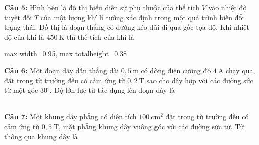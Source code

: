 \documentclass[12pt,a4paper]{article}
\begin{document}
\begin{minipage}{\textwidth}
\noindent \textbf{Câu 5:} Hình bên là đồ thị biểu diễn sự phụ thuộc của thể tích $V$ vào nhiệt độ tuyệt đối $T$ của một lượng khí lí tưởng xác định trong một quá trình biến đổi trạng thái. Đồ thị là đoạn thẳng có đường kéo dài đi qua gốc tọa độ. Khi nhiệt độ của khí là $450\ \text{K}$ thì thể tích của khí là\\
\begin{center}
\begin{adjustbox}{max width=0.95\linewidth, max totalheight=0.38\textheight}
\end{adjustbox}
\end{center}
\noindent{}
\end{minipage}


\begin{minipage}{\textwidth}
\noindent \textbf{Câu 6:} Một đoạn dây dẫn thẳng dài $0{,}5\ \text{m}$ có dòng điện cường độ $4\ \text{A}$ chạy qua, đặt trong từ trường đều có cảm ứng từ $0{,}2\ \text{T}$ sao cho dây hợp với các đường sức từ một góc $30^{\circ}$. Độ lớn lực từ tác dụng lên đoạn dây là\\
\noindent{}\\
\noindent{}
\end{minipage}


\begin{minipage}{\textwidth}
\noindent \textbf{Câu 7:} Một khung dây phẳng có diện tích $100\ \text{cm}^2$ đặt trong từ trường đều có cảm ứng từ $0{,}5\ \text{T}$, mặt phẳng khung dây vuông góc với các đường sức từ. Từ thông qua khung dây là\\
\noindent{}\\
\noindent{}
\end{minipage}
\end{document}
